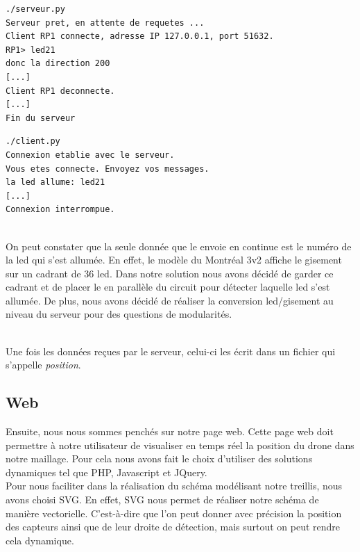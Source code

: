 \begin{minipage}[h]{0.45\linewidth}

\begin{lstlisting}
./serveur.py
Serveur pret, en attente de requetes ...
Client RP1 connecte, adresse IP 127.0.0.1, port 51632.
RP1> led21
donc la direction 200
[...]
Client RP1 deconnecte.
[...]
Fin du serveur
\end{lstlisting}  
\end{minipage}\hfill
\begin{minipage}[h]{0.45\linewidth}
  
\begin{lstlisting}
./client.py
Connexion etablie avec le serveur.
Vous etes connecte. Envoyez vos messages.
la led allume: led21
[...]
Connexion interrompue.
\end{lstlisting}

\end{minipage}

~\\

On peut constater que la seule donnée que le \rpi envoie en continue est le numéro de la led qui s'est allumée. En effet, le modèle du Montréal 3v2 affiche le gisement sur un cadrant de 36 led. Dans notre solution nous avons décidé de garder ce cadrant et de placer le \rpi en parallèle du circuit pour détecter laquelle led s'est allumée. De plus, nous avons décidé de réaliser la conversion led/gisement au niveau du serveur pour des questions de modularités. 

~\\

Une fois les données reçues par le serveur, celui-ci les écrit dans un fichier qui s'appelle \textit{position}.



\subsection{Web}

Ensuite, nous nous sommes penchés sur notre page web. Cette page web doit permettre à notre utilisateur de visualiser en temps réel la position du drone dans notre maillage. Pour cela nous avons fait le choix d'utiliser des solutions dynamiques tel que PHP, Javascript et JQuery.
~\\

Pour nous faciliter dans la réalisation du schéma modélisant notre treillis, nous avons choisi SVG. En effet, SVG nous permet de réaliser notre schéma de manière vectorielle. C'est-à-dire que l'on peut donner avec précision la position des capteurs ainsi que de leur droite de détection, mais surtout on peut rendre cela dynamique.
~\\

